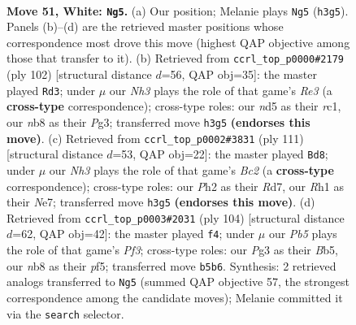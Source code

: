 \documentclass[11pt]{article}
\begin{document}
\clearpage

\begin{figure}[p]\centering
\begin{subfigure}{0.46\textwidth}\centering
\resizebox{\linewidth}{!}{%
\newchessgame
\chessboard[
  setfen={1nb2k2/r7/4p3/1P1n1p1B/1pN2P2/1P4PN/6KP/7R w - - 1 51},
  showmover=false,
  pgfstyle=straightmove, color=movearrow, markmove={h3-g5}
]}
\caption{}
\end{subfigure}\hfill
\begin{subfigure}{0.46\textwidth}\centering
\resizebox{\linewidth}{!}{%
\newchessgame
\chessboard[
  setfen={8/3k1p2/3n1pp1/1p5p/1P1N3P/2P1RPP1/5K2/2r5 w - - 1 52},
  showmover=false,
  pgfstyle=straightmove, color=movearrow, markmove={e3-d3}
]}
\caption{}
\end{subfigure}
\\[4pt]
\begin{subfigure}{0.46\textwidth}\centering
\resizebox{\linewidth}{!}{%
\newchessgame
\chessboard[
  setfen={8/p1brnkp1/5pp1/8/R5PP/2B1N3/1P2KP2/8 b - - 10 56},
  showmover=false,
  pgfstyle=straightmove, color=movearrow, markmove={c7-d8}
]}
\caption{}
\end{subfigure}\hfill
\begin{subfigure}{0.46\textwidth}\centering
\resizebox{\linewidth}{!}{%
\newchessgame
\chessboard[
  setfen={8/2b5/1p2p2k/1Bn2p2/Pp6/1P2PP2/2KN4/8 w - - 1 53},
  showmover=false,
  pgfstyle=straightmove, color=movearrow, markmove={f3-f4}
]}
\caption{}
\end{subfigure}
\caption{\textbf{Move 51, White: \texttt{Ng5}.} (a) Our position; Melanie plays \texttt{Ng5} (\texttt{h3g5}). Panels (b)--(d) are the retrieved master positions whose correspondence most drove this move (highest QAP objective among those that transfer to it). (b) Retrieved from \texttt{ccrl\_top\_p0000\#2179} (ply 102) [structural distance $d$=56, QAP obj=35]: the master played \texttt{Rd3}; under $\mu$ our \emph{Nh3} plays the role of that game's \emph{Re3} (a \textbf{cross-type} correspondence); cross-type roles: our \emph{n}d5 as their \emph{r}c1, our \emph{n}b8 as their \emph{P}g3; transferred move \texttt{h3g5} \textbf{(endorses this move)}. (c) Retrieved from \texttt{ccrl\_top\_p0002\#3831} (ply 111) [structural distance $d$=53, QAP obj=22]: the master played \texttt{Bd8}; under $\mu$ our \emph{Nh3} plays the role of that game's \emph{Bc2} (a \textbf{cross-type} correspondence); cross-type roles: our \emph{P}h2 as their \emph{R}d7, our \emph{R}h1 as their \emph{N}e7; transferred move \texttt{h3g5} \textbf{(endorses this move)}. (d) Retrieved from \texttt{ccrl\_top\_p0003\#2031} (ply 104) [structural distance $d$=62, QAP obj=42]: the master played \texttt{f4}; under $\mu$ our \emph{Pb5} plays the role of that game's \emph{Pf3}; cross-type roles: our \emph{P}g3 as their \emph{B}b5, our \emph{n}b8 as their \emph{p}f5; transferred move \texttt{b5b6}. Synthesis: 2 retrieved analogs transferred to \texttt{Ng5} (summed QAP objective 57, the strongest correspondence among the candidate moves); Melanie committed it via the \texttt{search} selector.}
\label{fig:thought-m100}
\end{figure}
\end{document}
